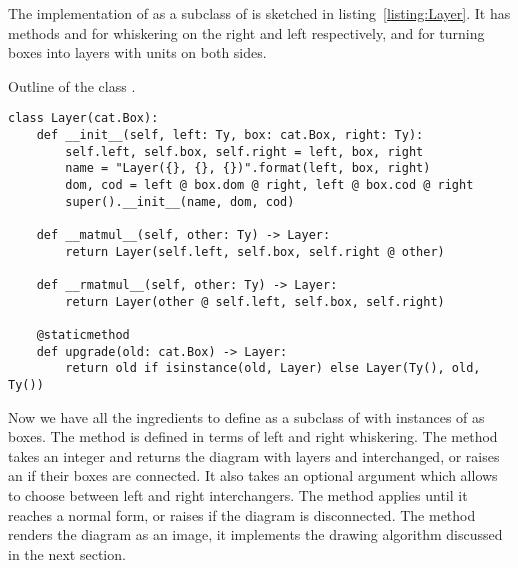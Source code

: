 The implementation of  as a subclass of  is sketched in listing~\ref{listing:Layer}.
It has methods  and   for whiskering on the right and left respectively, and  for turning boxes into layers with units on both sides.

\begin{python}\label{listing:Layer}
{\normalfont Outline of the class .}
\begin{verbatim}
class Layer(cat.Box):
    def __init__(self, left: Ty, box: cat.Box, right: Ty):
        self.left, self.box, self.right = left, box, right
        name = "Layer({}, {}, {})".format(left, box, right)
        dom, cod = left @ box.dom @ right, left @ box.cod @ right
        super().__init__(name, dom, cod)

    def __matmul__(self, other: Ty) -> Layer:
        return Layer(self.left, self.box, self.right @ other)

    def __rmatmul__(self, other: Ty) -> Layer:
        return Layer(other @ self.left, self.box, self.right)

    @staticmethod
    def upgrade(old: cat.Box) -> Layer:
        return old if isinstance(old, Layer) else Layer(Ty(), old, Ty())
\end{verbatim}
\end{python}

Now we have all the ingredients to define  as a subclass of  with instances of  as boxes.
The  method is defined in terms of left and right whiskering.
The  method takes an integer  and returns the diagram with layers  and  interchanged, or raises an  if their boxes are connected.
It also takes an optional argument  which allows to choose between left and right interchangers.
The  method applies  until it reaches a normal form, or raises  if the diagram is disconnected.
The  method renders the diagram as an image, it implements the drawing algorithm discussed in the next section.

